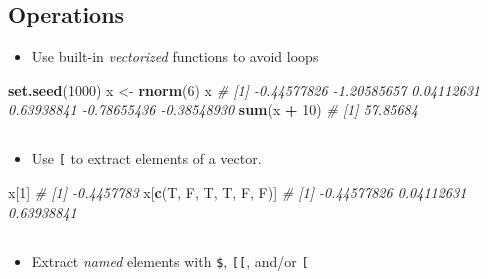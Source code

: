 \documentclass[]{article}
\newenvironment{Shaded}{\begin{snugshade}}{\end{snugshade}}
\newcommand{\CommentTok}[1]{\textcolor[rgb]{0.56,0.35,0.01}{\textit{#1}}}
\newcommand{\DecValTok}[1]{\textcolor[rgb]{0.00,0.00,0.81}{#1}}
\newcommand{\KeywordTok}[1]{\textcolor[rgb]{0.13,0.29,0.53}{\textbf{#1}}}
\newcommand{\NormalTok}[1]{#1}
\newcommand{\OperatorTok}[1]{\textcolor[rgb]{0.81,0.36,0.00}{\textbf{#1}}}
\newcommand{\StringTok}[1]{\textcolor[rgb]{0.31,0.60,0.02}{#1}}
\providecommand{\tightlist}{%
  \setlength{\itemsep}{0pt}\setlength{\parskip}{0pt}}
\begin{document}
\hypertarget{operations}{%
\subsection{Operations}\label{operations}}

\begin{itemize}
\tightlist
\item
  Use built-in \emph{vectorized} functions to avoid loops
\end{itemize}

\begin{Shaded}
\begin{Highlighting}[]
\KeywordTok{set.seed}\NormalTok{(}\DecValTok{1000}\NormalTok{)}
\NormalTok{x <-}\StringTok{ }\KeywordTok{rnorm}\NormalTok{(}\DecValTok{6}\NormalTok{)}
\NormalTok{x}
\CommentTok{# [1] -0.44577826 -1.20585657  0.04112631  0.63938841 -0.78655436 -0.38548930}
\KeywordTok{sum}\NormalTok{(x }\OperatorTok{+}\StringTok{ }\DecValTok{10}\NormalTok{)}
\CommentTok{# [1] 57.85684}
\end{Highlighting}
\end{Shaded}

\hypertarget{section}{%
\subsection{}\label{section}}

\begin{itemize}
\tightlist
\item
  Use \texttt{{[}} to extract elements of a vector.
\end{itemize}

\begin{Shaded}
\begin{Highlighting}[]
\NormalTok{x[}\DecValTok{1}\NormalTok{]}
\CommentTok{# [1] -0.4457783}
\NormalTok{x[}\KeywordTok{c}\NormalTok{(T, F, T, T, F, F)]}
\CommentTok{# [1] -0.44577826  0.04112631  0.63938841}
\end{Highlighting}
\end{Shaded}

\hypertarget{section-1}{%
\subsection{}\label{section-1}}

\begin{itemize}
\tightlist
\item
  Extract \emph{named} elements with \texttt{\$}, \texttt{{[}{[}},
  and/or \texttt{{[}}
\end{itemize}
\end{document}
